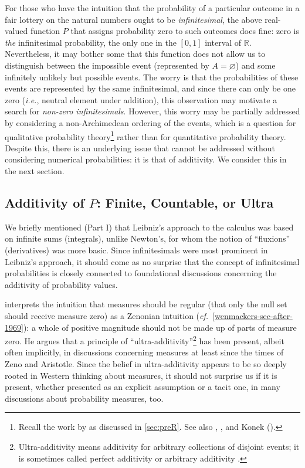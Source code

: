 For those who have the intuition that the probability of a particular outcome in a fair lottery on the natural numbers ought to be \emph{infinitesimal}, the above real-valued function $P$ that assigns probability zero to such outcomes does fine: zero is \emph{the} infinitesimal probability, the only one in the $[0,1]$ interval of $\mathbb{R}$.
Nevertheless, it may bother some that this function does not allow us to distinguish between the impossible event (represented by $A=\varnothing$) and some infinitely unlikely but possible events. The worry is that the probabilities of these events are represented by the same infinitesimal, and since there can only be one zero (\textit{i.e.}, neutral element under addition), this observation may motivate a search for \emph{non-zero infinitesimals}. However, this worry may be partially addressed by considering a non-Archimedean ordering of the events, which is a question for qualitative probability theory\footnote{Recall the work by \citet{deFinetti:1931} as discussed in \autoref{sec:preR}. See also \citet{Pedersen:2014a}, \citet[p.~17]{Easwaran:2014}, and Konek ().} rather than for quantitative probability theory.
Despite this, there is an underlying issue that cannot be addressed without considering numerical probabilities: it is that of additivity. We consider this in the next section.

\subsection{Additivity of $P$: Finite, Countable, or Ultra}\label{sec:AdditivityOfP}
We briefly mentioned (Part I) that Leibniz's approach to the calculus was based on infinite sums (integrals), unlike Newton's, for whom the notion of ``fluxions'' (derivatives) was more basic. Since infinitesimals were most prominent in Leibniz's approach, it should come as no surprise that the concept of infinitesimal probabilities is closely connected to foundational discussions concerning the additivity of probability values.

\citet{Skyrms:1983a} interprets the intuition that measures should be regular (that only the null set should receive measure zero) as a Zenonian intuition (\textit{cf.}\ \autoref{wenmackers-sec-after-1969}): a whole of positive magnitude should not be made up of parts of measure zero.
He argues that a principle of ``ultra-additivity''\footnote{Ultra-additivity means additivity for arbitrary collections of disjoint events; it is sometimes called perfect additivity \citep[see, \textit{e.g.},][Vol.~II, p.~118]{deFinetti:1974} or arbitrary additivity \citep{Hofweber:2014}.} has been present, albeit often implicitly, in discussions concerning measures at least since the times of Zeno and Aristotle. Since the belief in ultra-additivity appears to be so deeply rooted in Western thinking about measures, it should not surprise us if it is present, whether presented as an explicit assumption or a tacit one, in many discussions about probability measures, too.

